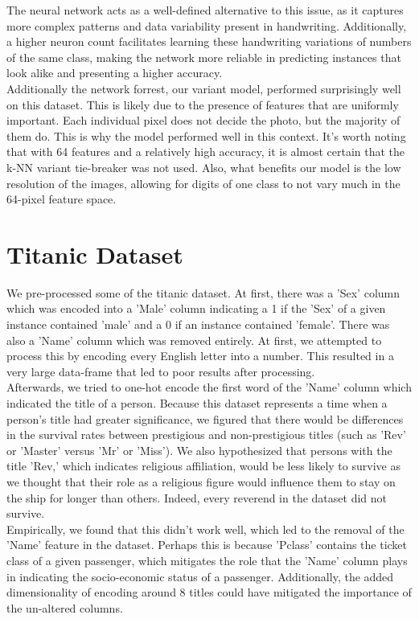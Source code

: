 \documentclass{article}
\begin{document}
The neural network acts as a well-defined alternative to this issue, as it captures more complex patterns and data variability present in handwriting.
Additionally, a higher neuron count facilitates learning these handwriting variations of numbers of the same class, making the network more reliable in predicting instances that look alike and presenting a higher accuracy.
\\

Additionally the network forrest, our variant model, performed surprisingly well on this dataset. This is likely due to the presence of features that
are uniformly important. Each individual pixel does not decide the photo, but the majority of them do. This is why the model performed well in this context.
It's worth noting that with 64 features and a relatively high accuracy, it is almost certain that the k-NN variant tie-breaker was not used.
Also, what benefits our model is the low resolution of the images, allowing for digits of one class to not vary much in the 64-pixel feature space.

\newpage
\section*{Titanic Dataset}
We pre-processed some of the titanic dataset. At first, there was a 'Sex' column which was encoded into a 'Male' column indicating a 1 if the 'Sex' of a given instance contained 'male' and a 0 if an instance contained 'female'.
There was also a 'Name' column which was removed entirely. At first, we attempted to process this by encoding every English letter into a number. This resulted in a very large data-frame that led to poor results after processing. 
\\

Afterwards, we tried to one-hot encode the first word of the 'Name' column which indicated the title of a person. Because this dataset represents a time when a person's title had greater significance, we figured that there would be differences in the survival rates between prestigious and non-prestigious titles (such as 'Rev' or 'Master' versus 'Mr' or 'Miss').
We also hypothesized that persons with the title 'Rev,' which indicates religious affiliation, would be less likely to survive as we thought that their role as a religious figure would influence them to stay on the ship for longer than others. Indeed, every reverend in the dataset did not survive.
\\

Empirically, we found that this didn't work well, which led to the removal of the 'Name' feature in the dataset.
Perhaps this is because 'Pclass' contains the ticket class of a given passenger, which mitigates the role that the 'Name' column plays in indicating the socio-economic status of a passenger. Additionally,
the added dimensionality of encoding around 8 titles could have mitigated the importance of the un-altered columns.
\\
\end{document}

